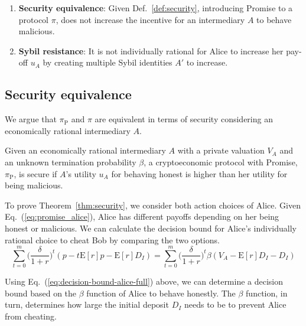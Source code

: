 \documentclass[runningheads]{llncs}
\newcommand{\sys}{Promise\xspace}
\begin{document}
\begin{enumerate}
    \item \textbf{Security equivalence}: Given Def.~\ref{def:security}, introducing \sys to a protocol $\pi$, does not increase the incentive for an intermediary $A$ to behave malicious.
    \item \textbf{Sybil resistance}: It is not individually rational for Alice to increase her pay-off $u_A$ by creating multiple Sybil identities $A'$ to increase.
\end{enumerate}



\subsection{Security equivalence}

We argue that $\pi_{\mathrm{P}}$ and $\pi$ are equivalent in terms of security considering an economically rational intermediary $A$.

\begin{theorem}
\label{thm:security}
Given an economically rational intermediary $A$ with a private valuation $V_A$ and an unknown termination probability $\beta$, a cryptoeconomic protocol with \sys, $\pi_{\mathrm{P}}$, is secure if $A$'s utility $u_A$ for behaving honest is higher than her utility for being malicious.  
\end{theorem}

To prove Theorem~\ref{thm:security}, we consider both action choices of Alice.
Given Eq.~(\ref{eq:promise_alice}), Alice has different payoffs depending on her being honest or malicious.
We can calculate the decision bound for Alice's individually rational choice to cheat Bob by comparing the two options.
\begin{equation}
\label{eq:decision-bound-alice-full}
     \sum_{t=0}^{m} \big( \frac{\delta}{1+r} \big)^{t} ( p - t\mathrm{E}[r]p -\mathrm{E}[r]D_{I}) = 
    \sum_{t=0}^{m} \big( \frac{\delta}{1+r} \big)^{t} \beta (V_A - \mathrm{E}[r]D_{I}-D_{I})
\end{equation}

Using Eq.~(\ref{eq:decision-bound-alice-full}) above, we can determine a decision bound based on the $\beta$ function of Alice to behave honestly.
The $\beta$ function, in turn, determines how large the initial deposit $D_I$ needs to be to prevent Alice from cheating.
\end{document}
